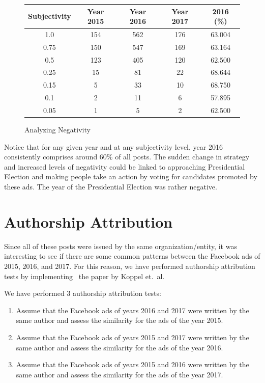 \documentclass{article}
\begin{document}
\begin{figure}[H]
  \centering
  \begin{tabular}{*{5}{c}}
    \toprule
    Subjectivity & Year 2015 & Year 2016 & Year 2017 & 2016 (\%)\\
    \midrule
    1.0  & 154 & 562 & 176 & 63.004\\
    \midrule
    0.75 & 150 & 547 & 169 & 63.164\\
    \midrule
    0.5  & 123 & 405 & 120 & 62.500\\
    \midrule
    0.25 & 15 & 81 & 22 & 68.644\\
    \midrule
    0.15 & 5 & 33 & 10 & 68.750\\
    \midrule
    0.1  & 2 & 11 & 6 & 57.895\\
    \midrule
    0.05 & 1 & 5 & 2 & 62.500\\
    \bottomrule
  \end{tabular}
  \caption{Analyzing Negativity}
\end{figure}

Notice that for any given year and at any subjectivity level, year 2016
consistently comprises around 60\% of all posts. The sudden change in strategy
and increased levels of negativity could be linked to approaching Presidential
Election and making people take an action by voting for candidates promoted by
these ads. The year of the Presidential Election was rather negative.


\section{Authorship Attribution}

Since all of these posts were issued by the same organization/entity, it was
interesting to see if there are some common patterns between the Facebook ads
of 2015, 2016, and 2017. For this reason, we have performed authorship
attribution tests by implementing~\cite{koppel11} the paper by Koppel et.~al.

\medskip

We have performed 3 authorship attribution tests:

\begin{enumerate}
  \item Assume that the Facebook ads of years 2016 and 2017 were written by the
        same author and assess the similarity for the ads of the year 2015.

  \item Assume that the Facebook ads of years 2015 and 2017 were written by the
        same author and assess the similarity for the ads of the year 2016.

  \item Assume that the Facebook ads of years 2015 and 2016 were written by the
        same author and assess the similarity for the ads of the year 2017.
\end{enumerate}
\end{document}
